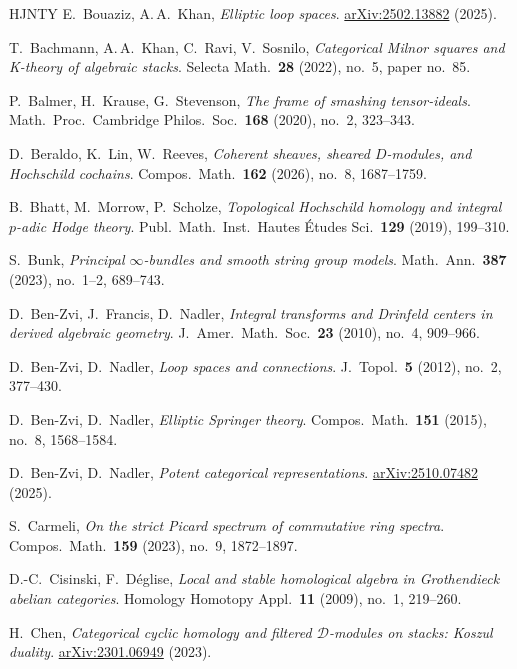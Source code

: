 \documentclass[12pt, oneside]{amsart}
\newcommand\arXiv[1]{\href{http://arxiv.org/abs/#1}{arXiv:#1}}
\numberwithin{equation}{section}
\theoremstyle{remark}
\theoremstyle{plain}
\begin{document}
\begin{thebibliography}{HJNTY}
   E.~Bouaziz, A.\,A.~Khan, \textit{Elliptic loop spaces}. \arXiv{2502.13882} (2025).

   T.~Bachmann, A.\,A.~Khan, C.~Ravi, V.~Sosnilo, \textit{Categorical Milnor squares and K-theory of algebraic stacks}. Selecta Math.\ {\bf{28}} (2022), no.~5, paper no.~85.

   P.~Balmer, H.~Krause, G.~Stevenson, \textit{The frame of smashing tensor-ideals}. Math.\ Proc.\ Cambridge Philos.\ Soc.\ {\bf{168}} (2020), no.~2, 323--343.

   D.~Beraldo, K.~Lin, W.~Reeves, \textit{Coherent sheaves, sheared $D$-modules, and Hochschild cochains}. Compos.\ Math.\ {\bf{162}} (2026), no.~8, 1687--1759.

   B.~Bhatt, M.~Morrow, P.~Scholze, \textit{Topological Hochschild homology and integral $p$-adic Hodge theory}. Publ.\ Math.\ Inst.\ Hautes \'Etudes Sci.\ {\bf{129}} (2019), 199--310.

   S.~Bunk, \textit{Principal $\infty$-bundles and smooth string group models}. Math.\ Ann.\ {\bf{387}} (2023), no.~1--2, 689--743.

   D.~Ben-Zvi, J.~Francis, D.~Nadler, \textit{Integral transforms and Drinfeld centers in derived algebraic geometry}. J.\ Amer.\ Math.\ Soc.\ {\bf{23}} (2010), no.~4, 909--966.

   D.~Ben-Zvi, D.~Nadler, \textit{Loop spaces and connections}. J.\ Topol.\ {\bf{5}} (2012), no.~2, 377--430.

   D.~Ben-Zvi, D.~Nadler, \textit{Elliptic Springer theory}. Compos.\ Math.\ {\bf{151}} (2015), no.~8, 1568--1584.

   D.~Ben-Zvi, D.~Nadler, \textit{Potent categorical representations}. \arXiv{2510.07482} (2025).

   S.~Carmeli, \textit{On the strict Picard spectrum of commutative ring spectra}. Compos.\ Math.\ {\bf{159}} (2023), no.~9, 1872--1897.

   D.-C.~Cisinski, F.~D\'eglise, \textit{Local and stable homological algebra in Grothendieck abelian categories}. Homology Homotopy Appl.\ {\bf{11}} (2009), no.~1, 219--260.

   H.~Chen, \textit{Categorical cyclic homology and filtered $\mathcal{D}$-modules on stacks: Koszul duality}. \arXiv{2301.06949} (2023).


\end{thebibliography}
\end{document}
